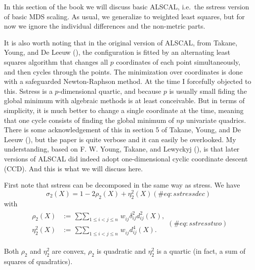 \documentclass[
  12pt,
  letterpaper,
  DIV=11,
  numbers=noendperiod]{scrreprt}
\theoremstyle{remark}
\begin{document}
In this section of the book we will discuss basic ALSCAL, i.e.~the
sstress version of basic MDS scaling. As usual, we generalize to
weighted least squares, but for now we ignore the individual differences
and the non-metric parts.

It is also worth noting that in the original version of ALSCAL, from
Takane, Young, and De Leeuw
(), the configuration is
fitted by an alternating least squares algorithm that changes all \(p\)
coordinates of each point simultaneously, and then cycles through the
points. The minimization over coordinates is done with a safeguarded
Newton-Raphson method. At the time I forcefully objected to this.
Sstress is a \(p\)-dimensional quartic, and because \(p\) is usually
small fiding the global minimum with algebraic methods is at least
conceivable. But in terms of simplicity, it is much better to change a
single coordinate at the time, meaning that one cycle consists of
finding the global minimum of \(np\) univariate quadrics. There is some
acknowledgement of this in section 5 of Takane, Young, and De Leeuw
(), but the paper is quite
verbose and it can easily be overlooked. My understanding, based on F.
W. Young, Takane, and Lewyckyj
(), is that later
versions of ALSCAL did indeed adopt one-dimensional cyclic coordinate
descent (CCD). And this is what we will discuss here.

First note that sstress can be decomposed in the same way as stress. We
have \begin{equation}
\sigma_2(X)=1-2\rho_2(X)+\eta_2^2(X)
(\#eq:sstressdec)
\end{equation} with \begin{align}
\begin{split}
\rho_2(X)&:=\mathop{\sum\sum}_{1\leq i < j\leq n} w_{ij}^{\ }\delta_{ij}^2d_{ij}^2(X),\\
\eta_2^2(X)&:=\mathop{\sum\sum}_{1\leq i < j\leq n} w_{ij}^{\ }d_{ij}^4(X).
\end{split} 
(\#eq:sstresstwo)
\end{align}

Both \(\rho_2\) and \(\eta_2^2\) are convex, \(\rho_2\) is quadratic and
\(\eta^2_2\) is a quartic (in fact, a sum of squares of quadratics).
\end{document}

